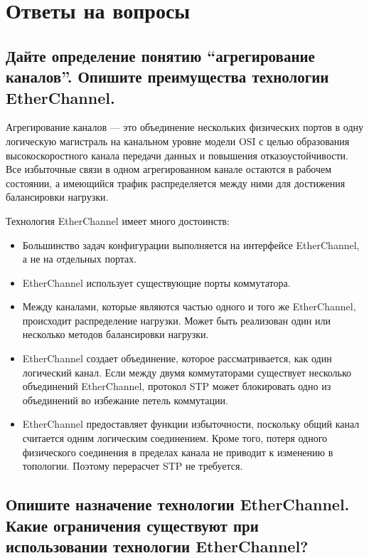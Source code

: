 \section{Ответы на вопросы}

\subsection{Дайте определение понятию “агрегирование каналов”. Опишите
преимущества технологии EtherChannel.}

Агрегирование каналов — это объединение нескольких физических
портов в одну логическую магистраль на канальном уровне модели OSI с
целью образования высокоскоростного канала передачи данных и
повышения отказоустойчивости. Все избыточные связи в одном
агрегированном канале остаются в рабочем состоянии, а имеющийся трафик
распределяется между ними для достижения балансировки нагрузки.

Технология EtherChannel имеет много достоинств:

\begin{itemize}
    \item Большинство задач конфигурации выполняется на интерфейсе
    EtherChannel, а не на отдельных портах.
    \item EtherChannel использует существующие порты коммутатора.
    \item Между каналами, которые являются частью одного и того же
    EtherChannel, происходит распределение нагрузки. Может быть
    реализован один или несколько методов балансировки нагрузки.
    \item EtherChannel создает объединение, которое рассматривается, как один
    логический канал. Если между двумя коммутаторами существует
    несколько объединений EtherChannel, протокол STP может
    блокировать одно из объединений во избежание петель коммутации.
    \item EtherChannel предоставляет функции избыточности, поскольку общий
    канал считается одним логическим соединением. Кроме того, потеря
    одного физического соединения в пределах канала не приводит к
    изменению в топологии. Поэтому перерасчет STP не требуется.
\end{itemize}

\subsection{Опишите назначение технологии EtherChannel. Какие
ограничения существуют при использовании технологии
EtherChannel?}

